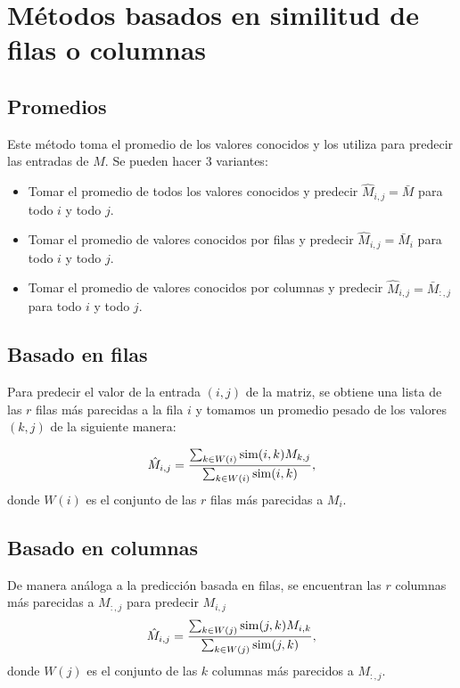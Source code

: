 \section{Métodos basados en similitud de filas o columnas}

\subsection{Promedios}
Este método toma el promedio de los valores conocidos y los utiliza para predecir las entradas de $M$. Se pueden hacer 3 variantes:
\begin{itemize}
    \item Tomar el promedio de todos los valores conocidos y predecir $\hat M_{i, j} = \bar M$ para todo $i$ y todo $j$.
    \item Tomar el promedio de valores conocidos por filas y predecir $\hat M_{i, j} = \bar M_i$ para todo $i$ y todo $j$.
    \item Tomar el promedio de valores conocidos por columnas y predecir $\hat M_{i, j} = \bar M_{:,j}$ para todo $i$ y todo $j$.
\end{itemize}

\subsection{Basado en filas}
Para predecir el valor de la entrada $(i, j)$ de la matriz, se obtiene una lista de las $r$ filas más parecidas a la fila $i$ y tomamos un promedio pesado de los valores $(k, j)$ de la siguiente manera:

\begin{equation}
    \label{eq:row_based}
    \hat M_{i, j} = \frac{\sum_{k \in W(i)}\operatorname{sim}(i, k) M_{k, j}}{\sum_{k \in W(i)} \operatorname{sim}(i, k)},
\end{equation}
donde $W(i)$ es el conjunto de las $r$ filas más parecidas a $M_i$.

\subsection{Basado en columnas}

De manera análoga a la predicción basada en filas, se encuentran las $r$ columnas más parecidas a $M_{:,j}$ para predecir $M_{i, j}$
\begin{equation}
    \label{eq:col_based}
    \hat M_{i, j} = \frac{\sum_{k \in W(j)}\operatorname{sim}(j, k) M_{i, k}}{\sum_{k \in W(j)} \operatorname{sim}(j, k)},
\end{equation}
donde $W(j)$ es el conjunto de las $k$ columnas más parecidos a $M_{:,j}$.

